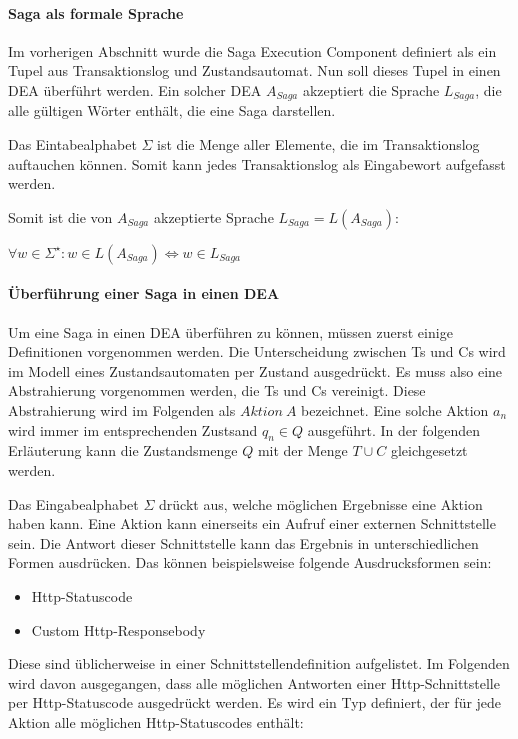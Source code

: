 \paragraph{Saga als formale Sprache}
Im vorherigen Abschnitt wurde die Saga Execution Component definiert als ein Tupel aus Transaktionslog und Zustandsautomat. Nun soll dieses Tupel in einen DEA überführt werden. Ein solcher DEA $A_{Saga}$ akzeptiert die Sprache $L_{Saga}$, die alle gültigen Wörter enthält, die eine Saga darstellen.

Das Eintabealphabet $\Sigma$ ist die Menge aller Elemente, die im Transaktionslog auftauchen können. Somit kann jedes Transaktionslog als Eingabewort aufgefasst werden. 

Somit ist die von $A_{Saga}$ akzeptierte Sprache $L_{Saga} = L(A_{Saga})$: \\

\begin{center}
$\forall w \in \Sigma^{\star}: w \in L(A_{Saga}) \iff w \in L_{Saga}$
\end{center}

\paragraph*{Überführung einer Saga in einen DEA}
Um eine Saga in einen DEA überführen zu können, müssen zuerst einige Definitionen vorgenommen werden. Die Unterscheidung zwischen Ts und Cs wird im Modell eines Zustandsautomaten per Zustand ausgedrückt. Es muss also eine Abstrahierung vorgenommen werden, die Ts und Cs vereinigt. Diese Abstrahierung wird im Folgenden als $Aktion\ A$ bezeichnet. Eine solche Aktion $a_n$ wird immer im entsprechenden Zustsand $q_n \in Q$ ausgeführt. In der folgenden Erläuterung kann die Zustandsmenge $Q$ mit der Menge $T \cup C$ gleichgesetzt werden.

Das Eingabealphabet $\Sigma$ drückt aus, welche möglichen Ergebnisse eine Aktion haben kann. Eine Aktion kann einerseits ein Aufruf einer externen Schnittstelle sein. Die Antwort dieser Schnittstelle kann das Ergebnis in unterschiedlichen Formen ausdrücken. Das können beispielsweise folgende Ausdrucksformen sein:
\begin{itemize}
	\item Http-Statuscode
	\item Custom Http-Responsebody
\end{itemize}
Diese sind üblicherweise in einer Schnittstellendefinition aufgelistet. Im Folgenden wird davon ausgegangen, dass alle möglichen Antworten einer Http-Schnittstelle per Http-Statuscode ausgedrückt werden. Es wird ein Typ definiert, der für jede Aktion alle möglichen Http-Statuscodes enthält: 

